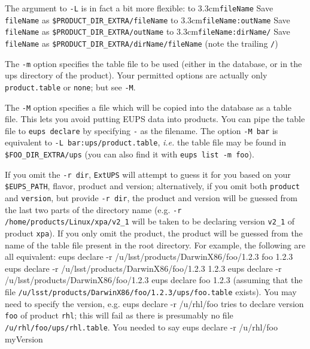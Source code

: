 \documentclass{article}
\newcommand{\code}[1]{\texttt{#1}}
\newcommand{\eups}{\code{ExtUPS}\xspace}
\let\overbatim=\verbatim
\let\oendverbatim=\endverbatim
\renewenvironment{verbatim}
{\center\minipage{16cm}\overbatim}
{\oendverbatim\endminipage\endcenter}
\begin{document}
The argument to \code{-L} is in fact a bit more flexible:\hfil\break
\hspace*{0.5cm}\hbox to 3.3cm{\code{fileName}\hfil}
Save \code{fileName} as \code{\$PRODUCT\_DIR\_EXTRA/fileName}\hfil\break
\hspace*{0.5cm}\hbox to 3.3cm{\code{fileName:outName}\hfil}
Save \code{fileName} as \code{\$PRODUCT\_DIR\_EXTRA/outName}\hfil\break
\hspace*{0.5cm}\hbox to 3.3cm{\code{fileName:dirName/}\hfil}
Save \code{fileName} as \code{\$PRODUCT\_DIR\_EXTRA/dirName/fileName} (note the trailing \code{/})

The \code{-m} option specifies the table
file to be used (either in the database, or in the ups directory of the product).
Your permitted options are actually only \code{product.table} or \code{none}; but see \code{-M}.

The \code{-M} option specifies a file which will be copied into the
database as a table file. This lets you avoid putting EUPS data
into products. You can pipe the table file to \code{eups declare} by
specifying \code{-} as the filename.  The option \code{-M bar} is equivalent to
\code{-L bar:ups/product.table}, \textit{i.e.} the table file may be found in \code{\$FOO\_DIR\_EXTRA/ups}
(you can also find it with \code{eups list -m foo}).

If you omit the \code{-r dir}, \eups will attempt to guess it for you based
on your \code{\$EUPS\_PATH}, flavor, product and version; alternatively,
if you omit both \code{product} and \code{version}, but provide \code{-r dir},
the product and version will be guessed from the last two parts of the directory
name (e.g. \code{-r /home/products/Linux/xpa/v2\_1} will be taken to be
declaring version \code{v2\_1} of product \code{xpa}).  If you only omit
the product, the product will be guessed from the name of the table file
present in the root directory. For example, the following are all equivalent:
\begin{verbatim}
  eups declare -r /u/lsst/products/DarwinX86/foo/1.2.3 foo 1.2.3
  eups declare -r /u/lsst/products/DarwinX86/foo/1.2.3 1.2.3
  eups declare -r /u/lsst/products/DarwinX86/foo/1.2.3
  eups declare foo 1.2.3
\end{verbatim}
(assuming that the file \code{/u/lsst/products/DarwinX86/foo/1.2.3/ups/foo.table}
exists). You may need to specify the version, e.g.
\begin{verbatim}
  eups declare -r /u/rhl/foo
\end{verbatim}
tries to declare version \code{foo} of product \code{rhl}; this will fail as
there is presumably no file \code{/u/rhl/foo/ups/rhl.table}.  You needed to say
\begin{verbatim}
  eups declare -r /u/rhl/foo myVersion
\end{verbatim}
\end{document}
